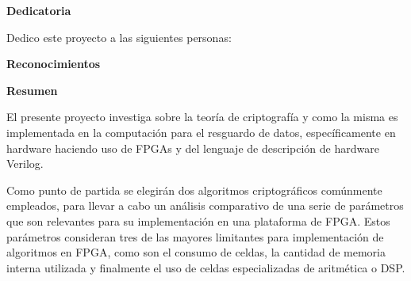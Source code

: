 \begin{center}\huge{\textbf{Dedicatoria}}\end{center}

Dedico este proyecto a las siguientes personas:
\blinditemize
\cleardoublepage

\begin{center}\huge{\textbf{Reconocimientos}}\end{center}
\blindtext
\cleardoublepage

\begin{center}\huge{\textbf{Resumen}}\end{center}


El presente proyecto investiga sobre la teoría de criptografía y como la misma es implementada en la computación para el resguardo de datos, específicamente en hardware haciendo uso de FPGAs y del lenguaje de descripción de hardware Verilog. 

Como punto de partida se elegirán dos algoritmos criptográficos comúnmente empleados, para llevar a cabo un análisis comparativo de una serie de parámetros que son relevantes para su implementación en una plataforma de FPGA. Estos parámetros consideran tres de las mayores limitantes para implementación de algoritmos en FPGA, como son el consumo de celdas, la cantidad de memoria interna utilizada y finalmente el uso de celdas especializadas de aritmética o DSP.
